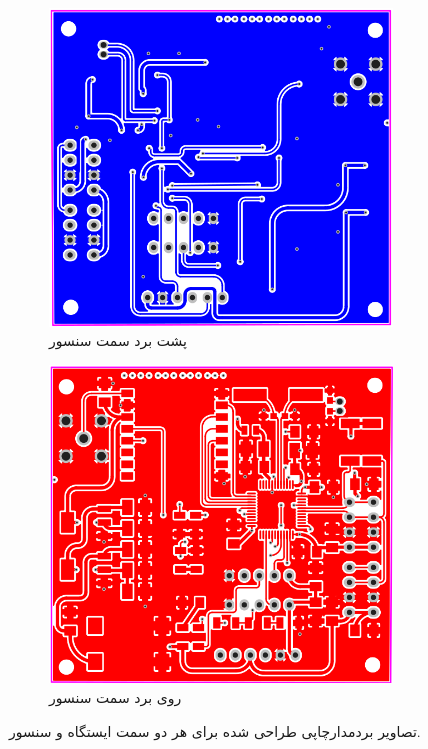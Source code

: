 \begin{figure}[!h]
\begin{subfigure}[b]{0.5\textwidth}
		\includegraphics[width=\linewidth]{Assets/transmitterBack.png}
		\caption{پشت برد سمت سنسور}
		\label{fig:}
	\end{subfigure}
	\begin{subfigure}[b]{0.5\textwidth}
		\includegraphics[width=\linewidth]{Assets/transmitterFront.png}
		\caption{روی برد سمت سنسور}
		\label{fig:}
	\end{subfigure}
	\caption{تصاویر بردمدارچاپی طراحی شده برای هر دو سمت ایستگاه و سنسور.}
\end{figure}
 

